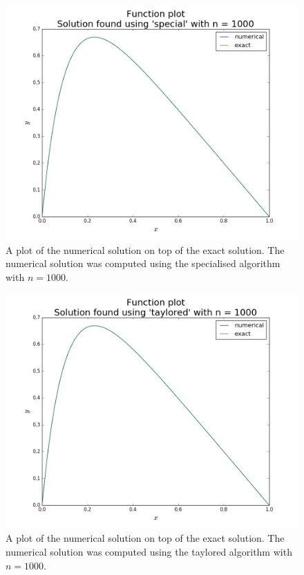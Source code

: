 \documentclass[reprint,english]{revtex4-1}
\begin{document}
\begin{figure}[h!]
\centering
\includegraphics[scale=0.274]{figures/special_1000_funcplot.png}
\caption{A plot of the numerical solution on top of the exact solution. The numerical solution was computed using the specialised algorithm with \(n=1000\).}\label{fig:spe_alg_n1000}
\end{figure}

\begin{figure}[h!]
\centering
\includegraphics[scale=0.274]{figures/taylored_1000_funcplot.png}
\caption{A plot of the numerical solution on top of the exact solution. The numerical solution was computed using the taylored algorithm with \(n=1000\).}\label{fig:tay_alg_n1000}
\end{figure}
\end{document}
